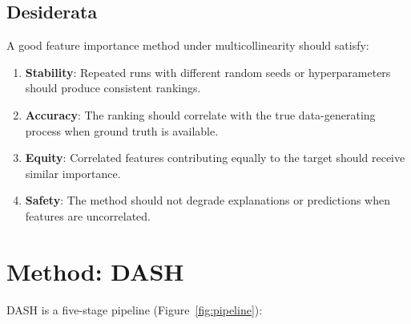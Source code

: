 \documentclass[11pt]{article}
\newcommand{\dash}{\textsc{DASH}}
\begin{document}
\subsection{Desiderata}

A good feature importance method under multicollinearity should satisfy:
\begin{enumerate}
  \item \textbf{Stability}: Repeated runs with different random seeds or
    hyperparameters should produce consistent rankings.
  \item \textbf{Accuracy}: The ranking should correlate with the true
    data-generating process when ground truth is available.
  \item \textbf{Equity}: Correlated features contributing equally to the
    target should receive similar importance.
  \item \textbf{Safety}: The method should not degrade explanations or
    predictions when features are uncorrelated.
\end{enumerate}


\section{Method: DASH}
\label{sec:method}

\dash{} is a five-stage pipeline (Figure~\ref{fig:pipeline}):
\end{document}
